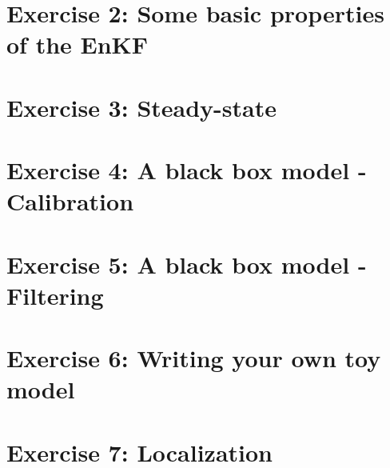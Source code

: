 \documentclass[a4paper,10pt]{article}
\begin{document}
\section{Exercise 2: Some basic properties of the EnKF}


\section{Exercise 3: Steady-state}


\section{Exercise 4: A black box model - Calibration}
\newcommand{\opgave}{exercise\_4}



\section{Exercise 5: A black box model - Filtering}


\section{Exercise 6: Writing your own toy model}


\section{Exercise 7: Localization}

\end{document}

